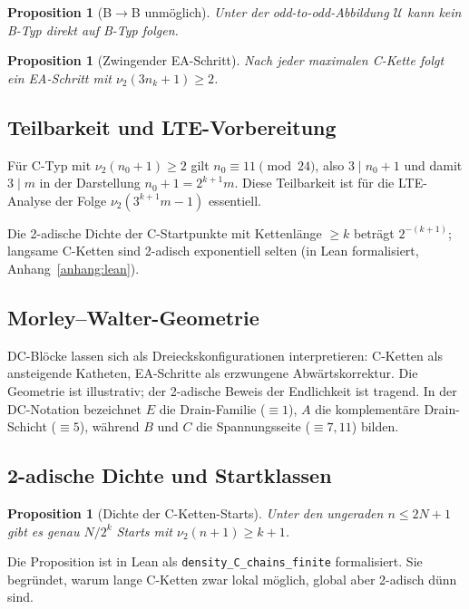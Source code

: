 \documentclass[12pt,a4paper]{article}
\newtheorem{proposition}[satz]{Proposition}
\newcommand{\vii}{\nu_2}
\newcommand{\U}{\mathcal{U}}
\begin{document}
\begin{proposition}[B$\to$B unmöglich]
\label{prop:bb}
Unter der odd-to-odd-Abbildung $\U$ kann kein B-Typ direkt auf B-Typ folgen.
\end{proposition}

\begin{proposition}[Zwingender EA-Schritt]
Nach jeder maximalen C-Kette folgt ein EA-Schritt mit
$\vii(3n_k+1) \geq 2$.
\end{proposition}

\subsection{Teilbarkeit und LTE-Vorbereitung}

Für C-Typ mit $\vii(n_0+1) \geq 2$ gilt $n_0 \equiv 11 \pmod{24}$,
also $3 \mid n_0+1$ und damit $3 \mid m$ in der Darstellung
$n_0+1 = 2^{k+1} m$. Diese Teilbarkeit ist für die LTE-Analyse der
Folge $\vii(3^{k+1}m-1)$ essentiell.

Die 2-adische Dichte der C-Startpunkte mit Kettenlänge $\geq k$ beträgt
$2^{-(k+1)}$; langsame C-Ketten sind 2-adisch exponentiell selten
(in Lean formalisiert, Anhang~\ref{anhang:lean}).

\subsection{Morley--Walter-Geometrie}

DC-Blöcke lassen sich als Dreieckskonfigurationen interpretieren:
C-Ketten als ansteigende Katheten, EA-Schritte als erzwungene
Abwärtskorrektur. Die Geometrie ist illustrativ; der 2-adische Beweis
der Endlichkeit ist tragend. In der DC-Notation bezeichnet $E$ die
Drain-Familie ($\equiv 1$), $A$ die komplementäre Drain-Schicht
($\equiv 5$), während $B$ und $C$ die Spannungsseite ($\equiv 7,11$)
bilden.

\subsection{2-adische Dichte und Startklassen}

\begin{proposition}[Dichte der C-Ketten-Starts]
Unter den ungeraden $n \leq 2N+1$ gibt es genau $N/2^k$ Starts mit
$\vii(n+1) \geq k+1$.
\end{proposition}

Die Proposition ist in Lean als \texttt{density\_C\_chains\_finite}
formalisiert. Sie begründet, warum lange C-Ketten zwar lokal möglich,
global aber 2-adisch dünn sind.
\end{document}
